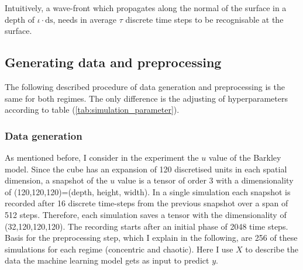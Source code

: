 Intuitively, a wave-front which propagates along the normal of the surface in a depth of $\iota\cdot\text{ds}$, needs in average $\tau$ discrete time steps to be recognisable at the surface. %

\subsection{Generating data and preprocessing}

The following described procedure of data generation and preprocessing is the same for both regimes. The only difference is the adjusting of hyperparameters according to table (\ref{tab:simulation_parameter}).

\subsubsection{Data generation}
As mentioned before, I consider in the experiment the $u$ value of the Barkley model. Since the cube has an expansion of 120 discretised units in each spatial dimension, a snapshot of the $u$ value is a tensor of order 3 with a dimensionality of (120,120,120)=(depth, height, width). 
In a single simulation each snapshot is recorded after 16 discrete time-steps from the previous snapshot over a span of 512 steps. Therefore, each simulation saves a tensor with the dimensionality of (32,120,120,120). The recording starts after an initial phase of 2048 time steps. Basis for the preprocessing step, which I explain in the following, are 256 of these simulations for each regime (concentric and chaotic). Here I use $X$ to describe the data the machine learning model gets as input to predict $y$.


